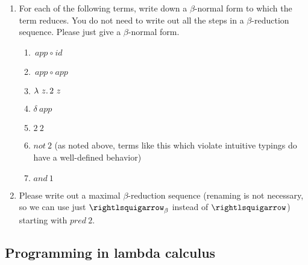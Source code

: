 \begin{enumerate}
\item For each of the following terms, write down a $\beta$-normal form to which the term reduces.  You do not need to write out all the steps in a $\beta$-reduction sequence.  Please just give a $\beta$-normal form.

  \begin{enumerate}
  \item $\textit{app}\ \circ\ \textit{id}$
\vspace{.5cm}
  \item $\textit{app}\ \circ\ \textit{app}$
\vspace{.5cm}
  \item $\lambda\ z.\, 2\ z$
\vspace{.5cm}
  \item $\delta\ \textit{app}$
\vspace{.5cm}
  \item $2\ 2$
\vspace{.5cm}
  \item $\textit{not}\ 2$ (as noted above, terms like this which violate intuitive typings do have a
    well-defined behavior)
\vspace{.5cm}
  \item $\textit{and}\ 1$
  \end{enumerate}

\item Please write out a maximal $\beta$-reduction sequence (renaming is not necessary, so we can use just $\betar$
  instead of $\betaa$) starting with $\textit{pred}\ 2$.

\end{enumerate}

\subsection{Programming in lambda calculus}

